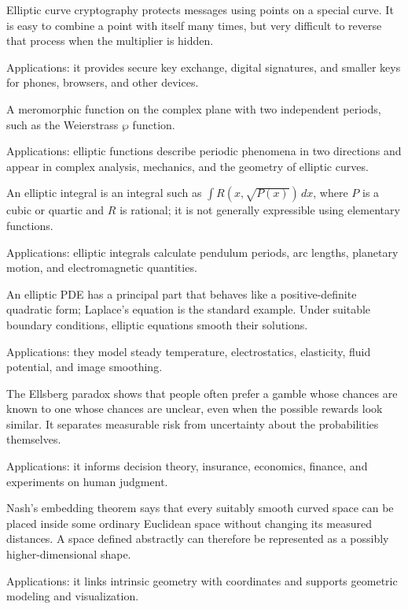 Elliptic curve cryptography protects messages using points on a special curve. It is easy to combine a point with itself many times, but very difficult to reverse that process when the multiplier is hidden. \par\noindent Applications: it provides secure key exchange, digital signatures, and smaller keys for phones, browsers, and other devices.

A meromorphic function on the complex plane with two independent periods, such as the Weierstrass $\wp$ function. \par\noindent Applications: elliptic functions describe periodic phenomena in two directions and appear in complex analysis, mechanics, and the geometry of elliptic curves.

An elliptic integral is an integral such as $\int R(x,\sqrt{P(x)})\,dx$, where $P$ is a cubic or quartic and $R$ is rational; it is not generally expressible using elementary functions. \par\noindent Applications: elliptic integrals calculate pendulum periods, arc lengths, planetary motion, and electromagnetic quantities.

An elliptic PDE has a principal part that behaves like a positive-definite quadratic form; Laplace's equation is the standard example. Under suitable boundary conditions, elliptic equations smooth their solutions. \par\noindent Applications: they model steady temperature, electrostatics, elasticity, fluid potential, and image smoothing.

The Ellsberg paradox shows that people often prefer a gamble whose chances are known to one whose chances are unclear, even when the possible rewards look similar. It separates measurable risk from uncertainty about the probabilities themselves. \par\noindent Applications: it informs decision theory, insurance, economics, finance, and experiments on human judgment.

Nash's embedding theorem says that every suitably smooth curved space can be placed inside some ordinary Euclidean space without changing its measured distances. A space defined abstractly can therefore be represented as a possibly higher-dimensional shape. \par\noindent Applications: it links intrinsic geometry with coordinates and supports geometric modeling and visualization.

